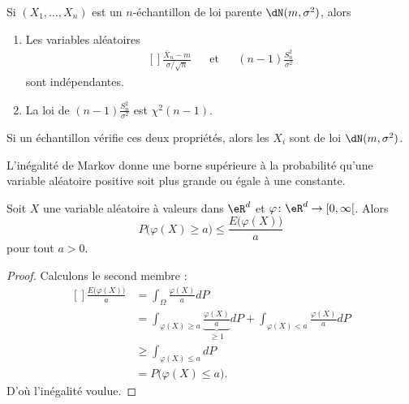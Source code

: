 \begin{theorem}
	Si \( (X_1,\ldots,X_n)\) est un \( n\)-échantillon de loi parente \( \dN(m,\sigma^2)\), alors
	\begin{enumerate}
		\item
		      Les variables aléatoires
		      \begin{equation}
			      \begin{aligned}[]
				      \frac{ \bar X_n-m }{ \sigma/\sqrt{n} } &  & \text{et} &  & (n-1)\frac{ S_n^2 }{ \sigma^2 }
			      \end{aligned}
		      \end{equation}
		      sont indépendantes.
		\item
		      La loi de \( (n-1)\frac{ S_n^2 }{ \sigma^2 }\) est \( \chi^2(n-1)\).
	\end{enumerate}
	Si un échantillon vérifie ces deux propriétés, alors les \( X_i\) sont de loi \( \dN(m,\sigma^2)\).
\end{theorem}


L'inégalité de Markov donne une borne supérieure à la probabilité qu'une variable aléatoire positive soit plus grande ou égale à une constante.
\begin{theorem}    \label{ThoInegMarkov}
	Soit \( X\) une variable aléatoire à valeurs dans \( \eR^d\) et \( \varphi\colon \eR^d\to \mathopen[ 0 , \infty [\). Alors
	\begin{equation}
		P\big( \varphi(X)\geq a \big)\leq\frac{ E\big( \varphi(X) \big) }{ a }
	\end{equation}
	pour tout \( a>0\).
\end{theorem}

\begin{proof}
	Calculons le second membre :
	\begin{equation}
		\begin{aligned}[]
			\frac{ E\big( \varphi(X) \big) }{ a } & =\int_{\Omega}\frac{ \varphi(X) }{ a }dP                                                                               \\
			                                      & =\int_{\varphi(X)\geq a}\underbrace{\frac{ \varphi(X) }{ a }}_{\geq 1}dP+\int_{\varphi(X)<a}\frac{ \varphi(X) }{ a }dP \\
			                                      & \geq\int_{\varphi(X)\leq a}dP                                                                                          \\
			                                      & =P\big( \varphi(X)\leq a \big).
		\end{aligned}
	\end{equation}
	D'où l'inégalité voulue.
\end{proof}


